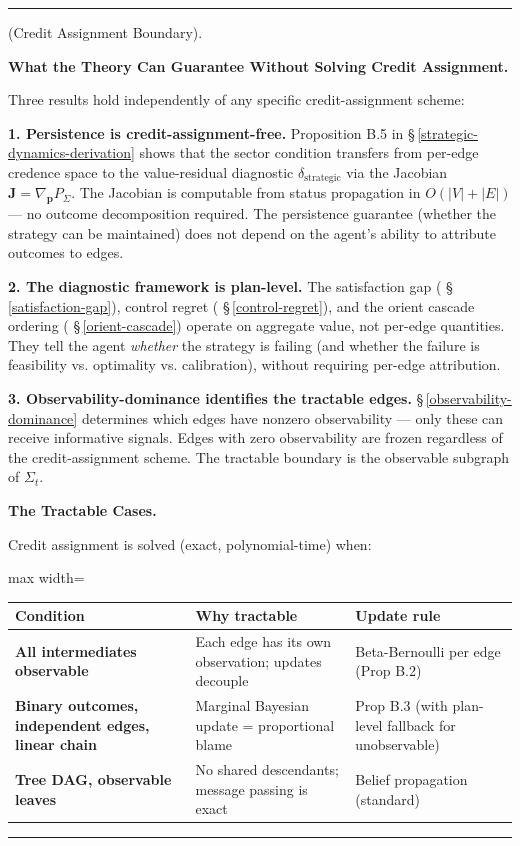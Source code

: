 \documentclass[11pt,oneside]{article}
\newcounter{claim}[section]
\renewcommand{\theclaim}{\thesection.\arabic{claim}}
\newenvironment{segment}[2]{%
  \refstepcounter{claim}%
  \bigskip\noindent\hrule\smallskip
  \noindent{\bfseries #1~\theclaim}\enskip(#2).\par\smallskip
  \noindent\ignorespaces
}{%
  \par\smallskip\noindent\hrule\bigskip
}
\newenvironment{discussion}[1][]{\begin{segment}{Discussion}{#1}}{\end{segment}}
\begin{document}
\begin{discussion}[Credit Assignment Boundary]
\medskip\noindent\textbf{What the Theory Can Guarantee Without Solving Credit Assignment.}


Three results hold independently of any specific credit-assignment scheme:

\textbf{1. Persistence is credit-assignment-free.} Proposition B.5 in \S\,\ref{strategic-dynamics-derivation} shows that the sector condition transfers from per-edge credence space to the value-residual diagnostic $\delta_{\text{strategic}}$ via the Jacobian $\mathbf{J} = \nabla_\mathbf{p} P_\Sigma$. The Jacobian is computable from status propagation in $O(\lvert V\rvert + \lvert E\rvert)$ — no outcome decomposition required. The persistence guarantee (whether the strategy can be maintained) does not depend on the agent's ability to attribute outcomes to edges.

\textbf{2. The diagnostic framework is plan-level.} The satisfaction gap ( \S\,\ref{satisfaction-gap}), control regret ( \S\,\ref{control-regret}), and the orient cascade ordering ( \S\,\ref{orient-cascade}) operate on aggregate value, not per-edge quantities. They tell the agent \textit{whether} the strategy is failing (and whether the failure is feasibility vs. optimality vs. calibration), without requiring per-edge attribution.

\textbf{3. Observability-dominance identifies the tractable edges.} \S\,\ref{observability-dominance} determines which edges have nonzero observability — only these can receive informative signals. Edges with zero observability are frozen regardless of the credit-assignment scheme. The tractable boundary is the observable subgraph of $\Sigma_t$.


\medskip\noindent\textbf{The Tractable Cases.}



Credit assignment is solved (exact, polynomial-time) when:

\begin{adjustbox}{max width=\textwidth}
\small
\begin{tabular}{lll}
\toprule
Condition & Why tractable & Update rule \\
\midrule
\textbf{All intermediates observable} & Each edge has its own observation; updates decouple & Beta-Bernoulli per edge (Prop B.2) \\
\textbf{Binary outcomes, independent edges, linear chain} & Marginal Bayesian update = proportional blame & Prop B.3 (with plan-level fallback for unobservable) \\
\textbf{Tree DAG, observable leaves} & No shared descendants; message passing is exact & Belief propagation (standard) \\
\bottomrule
\end{tabular}
\end{adjustbox}




\end{discussion}
\end{document}
